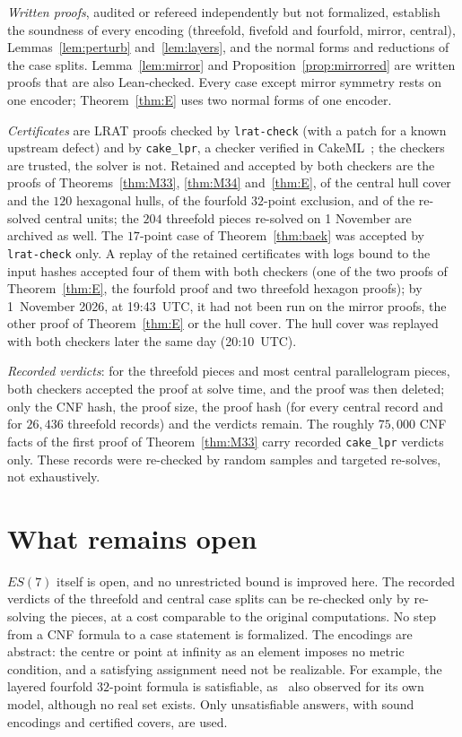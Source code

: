\documentclass[11pt]{article}
\theoremstyle{remark}
\begin{document}
\emph{Written proofs}, audited or refereed independently but not formalized, establish the soundness of every encoding
(threefold, fivefold and fourfold, mirror, central), Lemmas~\ref{lem:perturb} and~\ref{lem:layers}, and the normal
forms and reductions of the case splits. Lemma~\ref{lem:mirror} and Proposition~\ref{prop:mirrorred} are written proofs
that are also Lean-checked. Every case except mirror symmetry rests on one encoder; Theorem~\ref{thm:E} uses two normal
forms of one encoder.

\emph{Certificates} are LRAT proofs checked by \texttt{lrat-check} (with a patch for a known upstream defect) and by
\texttt{cake\_lpr}, a checker verified in CakeML~\cite{THM21}; the checkers are trusted, the solver is not. Retained and
accepted by both checkers are the proofs of Theorems~\ref{thm:M33}, \ref{thm:M34} and~\ref{thm:E}, of the central hull
cover and the $120$ hexagonal hulls, of the fourfold $32$-point exclusion, and of the re-solved central units; the
$204$ threefold pieces re-solved on 1 November are archived as well. The $17$-point case of
Theorem~\ref{thm:baek} was accepted by \texttt{lrat-check} only. A replay of the retained certificates with logs bound to
the input hashes accepted four of them with both checkers (one of the two proofs of Theorem~\ref{thm:E}, the fourfold
proof and two threefold hexagon proofs); by 1~November 2026, at 19:43~UTC, it had not been run on the mirror proofs,
the other proof of Theorem~\ref{thm:E} or the hull cover. The hull cover was replayed with both checkers later the same day (20:10~UTC).

\emph{Recorded verdicts}: for the threefold pieces and most central parallelogram pieces, both checkers accepted the proof
at solve time, and the proof was then deleted; only the CNF hash, the proof size, the proof hash (for every central
record and for $26{,}436$ threefold records) and the verdicts remain. The roughly $75{,}000$ CNF facts of the first proof
of Theorem~\ref{thm:M33} carry recorded \texttt{cake\_lpr} verdicts only. These records were re-checked by random
samples and targeted re-solves, not exhaustively.

\section{What remains open}
$ES(7)$ itself is open, and no unrestricted bound is improved here. The recorded verdicts of the threefold and central
case splits can be re-checked only by re-solving the pieces, at a cost comparable to the original computations. No step
from a CNF formula to a case statement is formalized. The encodings are abstract: the centre or point at infinity as an
element imposes no metric condition, and a satisfying assignment need not be realizable. For example, the layered
fourfold $32$-point formula is satisfiable, as~\cite{SMQH25} also observed for its own model, although no real set
exists. Only unsatisfiable answers, with sound encodings and certified covers, are used.
\end{document}
